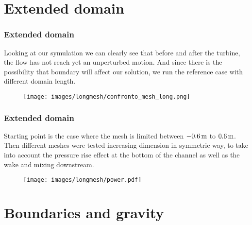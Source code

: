 \documentclass{beamer}
\begin{document}
\section{Extended domain}




\begin{frame}
\frametitle{Extended domain}
Looking at our symulation we can clearly see that before and after the turbine, the flow has not
reach yet an unperturbed motion. 
And since there is the possibility that boundary will affect our
solution, we run the reference case with different domain length.

\begin{figure}[H]
\centering
\texttt{[image: images/longmesh/confronto\_mesh\_long.png]}
\end{figure}

\end{frame}



\begin{frame}
\frametitle{Extended domain}

Starting point is the case where the mesh is limited between $-0.6\,\text{m}$ to  $0.6\,\text{m}$. 
Then different meshes
were tested increasing dimension in symmetric way, to take into account the pressure rise effect
at the bottom of the channel as well as the wake and mixing downstream.

\begin{figure}[H]
\centering
\texttt{[image: images/longmesh/power.pdf]}
\end{figure}

\end{frame}


\section{Boundaries and gravity}
\end{document}
